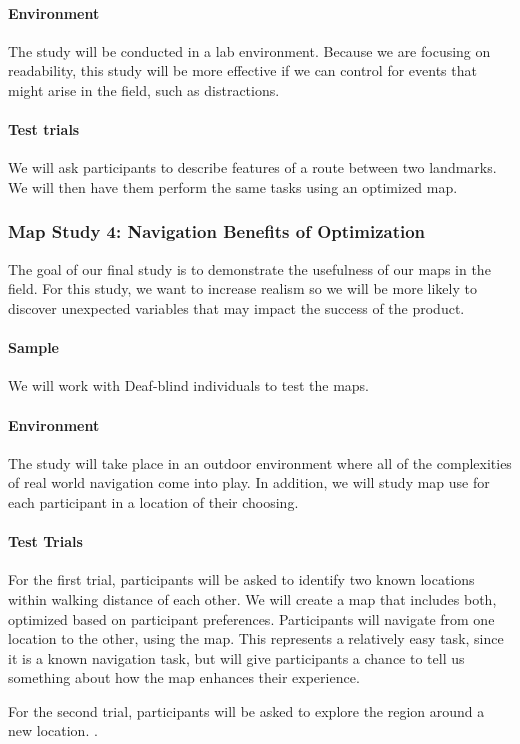 \paragraph{Environment}
The study will be conducted in a lab environment. Because we are focusing on readability, this study will be more effective if we can control for events that might arise in the field, such as distractions.

\paragraph{Test trials}
We will ask participants to describe features of a route between two landmarks. We will then have them perform the same tasks using an optimized map. 



\subsubsection{Map Study 4: Navigation Benefits of Optimization}
\label{sec:field-map}
The goal of our final study is to demonstrate the usefulness of our maps in the field. For this study, we want to increase realism so we will be more likely to discover unexpected variables that may impact the success of the product. 

\paragraph{Sample}
We will work with Deaf-blind individuals to test the maps. 

\paragraph{Environment}
The study will take place in an outdoor environment where all of the complexities of real world navigation come into play. In addition, we will study map use for each participant in a location of their choosing.

\paragraph{Test Trials}
For the first trial, participants will be asked to identify two known locations within walking distance of each other. We will create a map that includes both, optimized based on participant preferences. Participants will navigate from one location to the other, using the map. This represents a relatively easy task, since it is a known navigation task, but will give participants a chance to tell us something about how the map enhances their experience.

For the second trial, participants will be asked to explore the region around a new location. .

